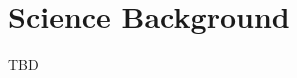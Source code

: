 

\chapter[Science Background]{Science Background}
\label{ch:science_background}

TBD 

 




%
%
%
%
%

